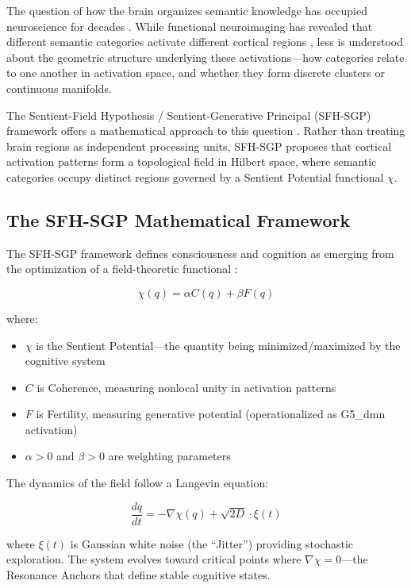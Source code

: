 \documentclass[12pt]{article}
\numberwithin{equation}{section}
\begin{document}
The question of how the brain organizes semantic knowledge has occupied neuroscience for decades \citep{Hickok2007, Binder2016}. While functional neuroimaging has revealed that different semantic categories activate different cortical regions \citep{Huth2016}, less is understood about the geometric structure underlying these activations---how categories relate to one another in activation space, and whether they form discrete clusters or continuous manifolds.

The Sentient-Field Hypothesis / Sentient-Generative Principal (SFH-SGP) framework offers a mathematical approach to this question \citep{Traver2026}. Rather than treating brain regions as independent processing units, SFH-SGP proposes that cortical activation patterns form a topological field in Hilbert space, where semantic categories occupy distinct regions governed by a Sentient Potential functional $\chi$.

\subsection{The SFH-SGP Mathematical Framework}

The SFH-SGP framework defines consciousness and cognition as emerging from the optimization of a field-theoretic functional \citep{Traver2026}:

\begin{equation}
	\chi(q) = \alpha C(q) + \beta F(q)
	\label{eq:chi}
\end{equation}

where:
\begin{itemize}
	\item $\chi$ is the Sentient Potential---the quantity being minimized/maximized by the cognitive system
	\item $C$ is Coherence, measuring nonlocal unity in activation patterns
	\item $F$ is Fertility, measuring generative potential (operationalized as G5\_dmn activation)
	\item $\alpha > 0$ and $\beta > 0$ are weighting parameters
\end{itemize}

The dynamics of the field follow a Langevin equation:

\begin{equation}
	\frac{dq}{dt} = -\nabla\chi(q) + \sqrt{2D}\cdot\xi(t)
	\label{eq:langevin}
\end{equation}

where $\xi(t)$ is Gaussian white noise (the ``Jitter'') providing stochastic exploration. The system evolves toward critical points where $\nabla\chi = 0$---the Resonance Anchors that define stable cognitive states.
\end{document}
